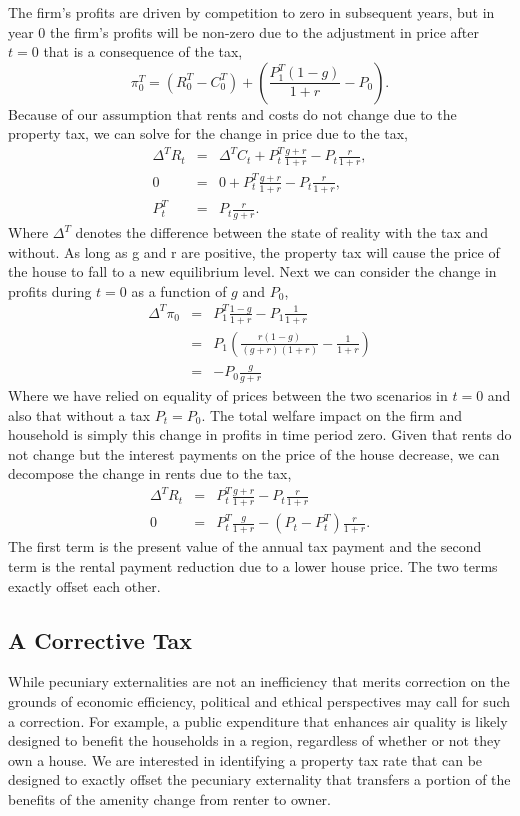 \documentclass[ecta,nameyear,draft]{econsocart}
\theoremstyle{plain}
\theoremstyle{remark}
\begin{document}
The firm's profits are driven by competition to zero in subsequent years, but in year 0 the firm's profits will be non-zero due to the adjustment in price after $t=0$ that is a consequence of the tax,
\begin{equation*}
	\pi^T_0 = (R^T_0-C^T_0)+\left(\frac{P^T_{1}(1-g)}{1+r}-P_0\right).\label{piT0}
\end{equation*}
Because of our assumption that rents and costs do not change due to the property tax, we can solve for the change in price due to the tax,
\begin{eqnarray}
	\Delta^T R_t&=&\Delta^T C_t+P^T_{t}\frac{g+r}{1+r}-P_{t} \frac{r}{1+r},\nonumber \\
	0&=&0+P^T_{t}\frac{g+r}{1+r}-P_{t} \frac{r}{1+r},\nonumber \\
	P^T_t&=& P_t\frac{r}{g+r}.\label{TxPrice}\nonumber
\end{eqnarray}
Where $\Delta^T$ denotes the difference between the state of reality with the tax and without. As long as g and r are positive, the property tax will cause the price of the house to fall to a new equilibrium level.
Next we can consider the change in profits during $t=0$ as a function of $g$ and $P_0$,
\begin{eqnarray*}
	\Delta^T \pi_0 &=& P_1^T\frac{1-g}{1+r}-P_1\frac{1}{1+r}\\
	&=& P_1\left(\frac{r(1-g)}{(g+r)(1+r)}-\frac{1}{1+r}\right)\\
	&=&-P_0\frac{g}{g+r}
\end{eqnarray*}
Where we have relied on equality of prices between the two scenarios in $t=0$ and also that without a tax $P_t=P_0$. The total welfare impact on the firm and household is simply this change in profits in time period zero.
Given that rents do not change but the interest payments on the price of the house decrease, we can decompose the change in rents due to the tax,
\begin{eqnarray*}
	\Delta^T R_t&=&P^T_t\frac{g+r}{1+r}-P_t\frac{r}{1+r}\\
	0&=&P^T_t\frac{g}{1+r}-(P_t-P_t^T)\frac{r}{1+r}.
\end{eqnarray*}
The first term is the present value of the annual tax payment and the second term is the rental payment reduction due to a lower house price. The two terms exactly offset each other.

\subsection{A Corrective Tax}
While pecuniary externalities are not an inefficiency that merits correction on the grounds of economic efficiency, political and ethical perspectives may call for such a correction. For example, a public expenditure that enhances air quality is likely designed to benefit the households in a region, regardless of whether or not they own a house. We are interested in identifying a property tax rate that can be designed to exactly offset the pecuniary externality that transfers a portion of the benefits of the amenity change from renter to owner.
\end{document}
